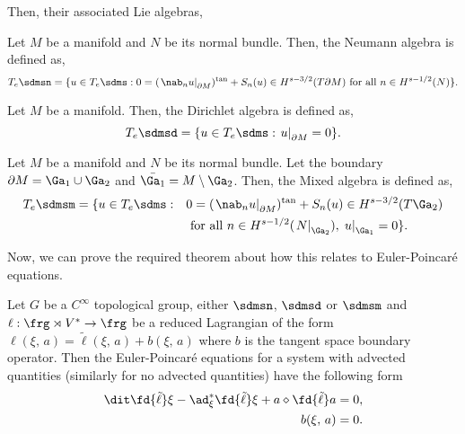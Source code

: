 \noindent
Then, their associated Lie algebras,
\begin{ndefi}
  Let $M$ be a manifold and $N$ be its normal bundle. Then, the Neumann algebra is defined as,
  $$ T_e\sdmsn = \{ u \in T_e\sdms : 0 = (\left.\nab_n u\right|_{\partial M})^{\text{tan}} + S_n(u)\in H^{s - 3/2}(T\partial M) \text{ for all } n \in H^{s - 1/2}(N) \}. $$
\end{ndefi}
\begin{ndefi}
  Let $M$ be a manifold. Then, the Dirichlet algebra is defined as,
  $$ T_e\sdmsd =  \{ u \in T_e\sdms : \left. u \right|_{\partial M} = 0\}. $$
\end{ndefi}
\begin{ndefi}
  Let $M$ be a manifold and $N$ be its normal bundle. Let the boundary $\partial M = \Ga_1 \cup \Ga_2$ and $\bar{\Ga_1} = M \setminus \Ga_2$. Then, the Mixed algebra is defined as,
  \begin{align*}
    T_e\sdmsm = \{ u \in T_e\sdms :\quad &0 = (\left.\nab_n u\right|_{\partial M})^{\text{tan}} + S_n(u)\in H^{s - 3/2}(T\Ga_2)\\
    &\text{ for all } n \in H^{s - 1/2} (\left.N\right|_{\Ga_2}),\, \left. u \right|_{\Ga_1} = 0\}.
  \end{align*}
\end{ndefi}
\noindent
Now, we can prove the required theorem about how this relates to Euler-Poincar\'e equations.
\begin{nthm}
  Let $G$ be a $C^\infty$ topological group, either $\sdmsn$, $\sdmsd$ or $\sdmsm$ and $\ell : \frg \rtimes V^* \to \frg$ be a reduced Lagrangian of the form $\ell(\xi,\, a) = \tilde \ell(\xi,\,a) + b(\xi,\,a)$ where $b$ is the tangent space boundary operator. Then the Euler-Poincar\'e equations for a system with advected quantities (similarly for no advected quantities) have the following form
  \begin{equation}
    \begin{split}
      \dit \fd {\tilde \ell} \xi - \ad_\xi^* \fd {\tilde \ell} \xi + a \diamond \fd {\tilde \ell} a &= 0, \\
      b(\xi,\, a) & =0.
    \end{split}\label{eq:epa_bc}
  \end{equation}
\end{nthm}
